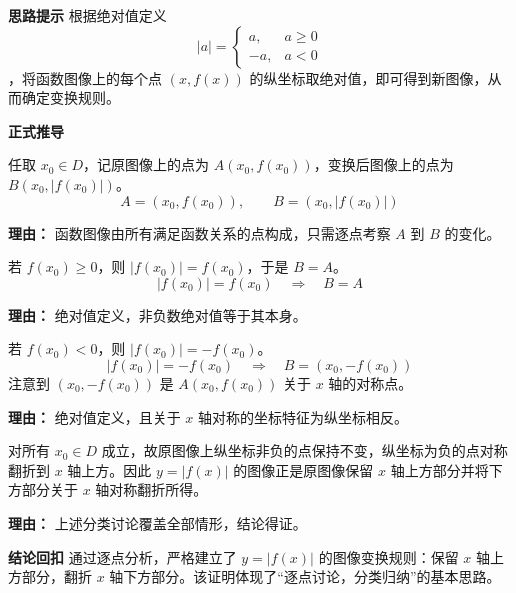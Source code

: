\begin{proofbox}
	\textbf{\textcolor{CProof}{思路提示}}
	根据绝对值定义
	\[
		|a| =
		\begin{cases}
			a, & a\ge0\\ -a, & a<0
		\end{cases}
	\]
	，将函数图像上的每个点 $(x,f(x))$ 的纵坐标取绝对值，即可得到新图像，从而确定变换规则。

	\medskip
	\textbf{\textcolor{CProof}{正式推导}}
	\begin{description}[style=nextline, leftmargin=2.8em, labelsep=0.5em, itemsep=0.55em]
		\item[\textbf{步骤一（设定任意点）：}]
			任取 $x_0\in D$，记原图像上的点为 $A(x_0, f(x_0))$，变换后图像上的点为 $B(x_0, |f(x_0)|)$。
			\[
				A = (x_0, f(x_0)),
				\qquad
				B = (x_0, |f(x_0)|)
			\]
			\par\textbf{理由：} 函数图像由所有满足函数关系的点构成，只需逐点考察 $A$ 到 $B$ 的变化。
		\item[\textbf{步骤二（非负情况）：}]
			若 $f(x_0)\ge0$，则 $|f(x_0)| = f(x_0)$，于是 $B = A$。
			\[
				|f(x_0)| = f(x_0) \quad\Longrightarrow\quad B = A
			\]
			\par\textbf{理由：} 绝对值定义，非负数绝对值等于其本身。
		\item[\textbf{步骤三（负值情况）：}]
			若 $f(x_0)<0$，则 $|f(x_0)| = -f(x_0)$。
			\[
				|f(x_0)| = -f(x_0) \quad\Longrightarrow\quad B = (x_0, -f(x_0))
			\]
			注意到 $(x_0, -f(x_0))$ 是 $A(x_0, f(x_0))$ 关于 $x$ 轴的对称点。
			\par\textbf{理由：} 绝对值定义，且关于 $x$ 轴对称的坐标特征为纵坐标相反。
		\item[\textbf{步骤四（归纳总结）：}]
			对所有 $x_0\in D$ 成立，故原图像上纵坐标非负的点保持不变，纵坐标为负的点对称翻折到 $x$ 轴上方。因此 $y=|f(x)|$ 的图像正是原图像保留 $x$ 轴上方部分并将下方部分关于 $x$ 轴对称翻折所得。
			\par\textbf{理由：} 上述分类讨论覆盖全部情形，结论得证。
	\end{description}

	\medskip
	\textbf{\textcolor{CProof}{结论回扣}}
	通过逐点分析，严格建立了 $y=|f(x)|$ 的图像变换规则：保留 $x$ 轴上方部分，翻折 $x$ 轴下方部分。该证明体现了“逐点讨论，分类归纳”的基本思路。
\end{proofbox}
